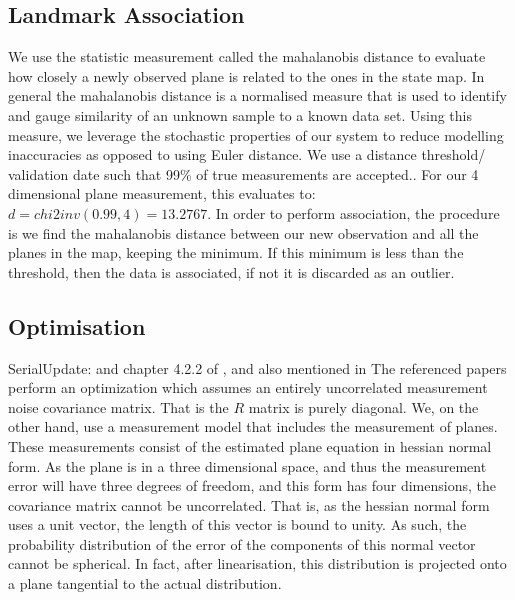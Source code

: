 \documentclass[]{article}
\begin{document}
{%

\subsection{Landmark Association} %
\label{sub:landmark_association}
We use the statistic measurement called the mahalanobis distance to evaluate how closely a newly observed plane is related to the ones in the state map. In general the mahalanobis distance is a normalised measure that is used to identify and gauge similarity of an unknown sample to a known data set. Using this measure, we leverage the stochastic properties of our system to reduce modelling inaccuracies as opposed to using Euler distance. We use a distance threshold/ validation date such that 99\% of true measurements are accepted.. For our 4 dimensional plane measurement, this evaluates to:
$ d = chi2inv(0.99,4) = 13.2767$. In order to perform association, the procedure is we find the mahalanobis distance between our new observation and all the planes in the map, keeping the minimum. If this minimum is less than the threshold, then the data is associated, if not it is discarded as an outlier.

\subsection{Optimisation} %
\label{sub:optimisation}

SerialUpdate: \cite{OpenPilotPaper} and chapter 4.2.2 of \cite{KFBookSerialupdate}, and also mentioned in \cite{Sola2013}
The referenced papers perform an optimization which assumes an entirely uncorrelated measurement noise covariance matrix. That is the $R$ matrix is purely diagonal.
We, on the other hand, use a measurement model that includes the measurement of planes. These measurements consist of the estimated plane equation in hessian normal form. As the plane is in a three dimensional space, and thus the measurement error will have three degrees of freedom, and this form has four dimensions, the covariance matrix cannot be uncorrelated.
That is, as the hessian normal form uses a unit vector, the length of this vector is bound to unity. As such, the probability distribution of the error of the components of this normal vector cannot be spherical.
In fact, after linearisation, this distribution is projected onto a plane tangential to the actual distribution. 

}
\end{document}
